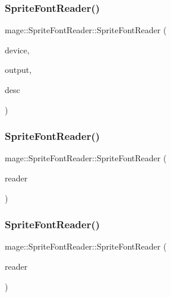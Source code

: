 \subsubsection{\texorpdfstring{Sprite\+Font\+Reader()}{SpriteFontReader()}\hspace{0.1cm}{\footnotesize\ttfamily [1/3]}}
{\footnotesize\ttfamily mage\+::\+Sprite\+Font\+Reader\+::\+Sprite\+Font\+Reader (\begin{DoxyParamCaption}\item[{I\+D3\+D11\+Device2 $\ast$}]{device,  }\item[{\hyperlink{structmage_1_1_sprite_font_output}{Sprite\+Font\+Output} \&}]{output,  }\item[{const \hyperlink{structmage_1_1_sprite_font_descriptor}{Sprite\+Font\+Descriptor} \&}]{desc }\end{DoxyParamCaption})\hspace{0.3cm}{\ttfamily [explicit]}}

\hypertarget{classmage_1_1_sprite_font_reader_a81f2b8ceab31ea5006d2bef498a03bbc}{}\label{classmage_1_1_sprite_font_reader_a81f2b8ceab31ea5006d2bef498a03bbc} 
\subsubsection{\texorpdfstring{Sprite\+Font\+Reader()}{SpriteFontReader()}\hspace{0.1cm}{\footnotesize\ttfamily [2/3]}}
{\footnotesize\ttfamily mage\+::\+Sprite\+Font\+Reader\+::\+Sprite\+Font\+Reader (\begin{DoxyParamCaption}\item[{const \hyperlink{classmage_1_1_sprite_font_reader}{Sprite\+Font\+Reader} \&}]{reader }\end{DoxyParamCaption})\hspace{0.3cm}{\ttfamily [delete]}}

\hypertarget{classmage_1_1_sprite_font_reader_a2130816e03384c99af146a21795ac5e8}{}\label{classmage_1_1_sprite_font_reader_a2130816e03384c99af146a21795ac5e8} 
\subsubsection{\texorpdfstring{Sprite\+Font\+Reader()}{SpriteFontReader()}\hspace{0.1cm}{\footnotesize\ttfamily [3/3]}}
{\footnotesize\ttfamily mage\+::\+Sprite\+Font\+Reader\+::\+Sprite\+Font\+Reader (\begin{DoxyParamCaption}\item[{\hyperlink{classmage_1_1_sprite_font_reader}{Sprite\+Font\+Reader} \&\&}]{reader }\end{DoxyParamCaption})\hspace{0.3cm}{\ttfamily [delete]}}


